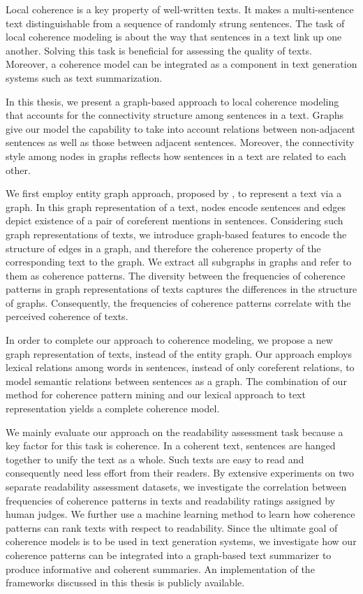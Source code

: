 \addchap*{\abstractname}

Local coherence is a key property of well-written texts. It makes a multi-sentence text distinguishable from a sequence of randomly strung sentences. 
The task of local coherence modeling is about the way that sentences in a text link up one another.  
Solving this task is beneficial for assessing the quality of texts. 
Moreover, a coherence model can be integrated as a component in text generation systems such as text summarization. 

In this thesis, we present a graph-based approach to local coherence modeling that accounts for the connectivity structure among sentences in a text. 
Graphs give our model the capability to take into account relations between non-adjacent sentences as well as those between adjacent sentences. 
Moreover, the connectivity style among nodes in graphs reflects how sentences in a text are related to each other. 

We first employ entity graph approach, proposed by , to represent a text via a graph. 
In this graph representation of a text, nodes encode sentences and edges depict existence of a pair of coreferent mentions in sentences.    
Considering such graph representations of texts, we introduce graph-based features to encode the structure of edges in a graph, and therefore the coherence property of the corresponding text to the graph.   
We extract all subgraphs in graphs and refer to them as coherence patterns. 
The diversity between the frequencies of coherence patterns in graph representations of texts captures the differences in the structure of graphs.  
Consequently, the frequencies of coherence patterns correlate with the perceived coherence of texts.  

In order to complete our approach to coherence modeling, we propose a new graph representation of texts, instead of the entity graph.  
Our approach employs lexical relations among words in sentences, instead of only coreferent relations, to model semantic relations between sentences as a graph. 
The combination of our method for coherence pattern mining and our lexical approach to text representation yields a complete coherence model. 

We mainly evaluate our approach on the readability assessment task because a key factor for this task is coherence. 
In a coherent text, sentences are hanged together to unify the text as a whole. 
Such texts are easy to read and consequently need less effort from their readers. 
By extensive experiments on two separate readability assessment datasets, 
we investigate the correlation between frequencies of coherence patterns in texts and readability ratings assigned by human judges.    
We further use a machine learning method to learn how coherence patterns can rank texts with respect to readability. 
Since the ultimate goal of coherence models is to be used in text generation systems, we investigate how our coherence patterns can be integrated into a graph-based text summarizer to produce informative and coherent summaries. 
An implementation of the frameworks discussed in this thesis is publicly available.

